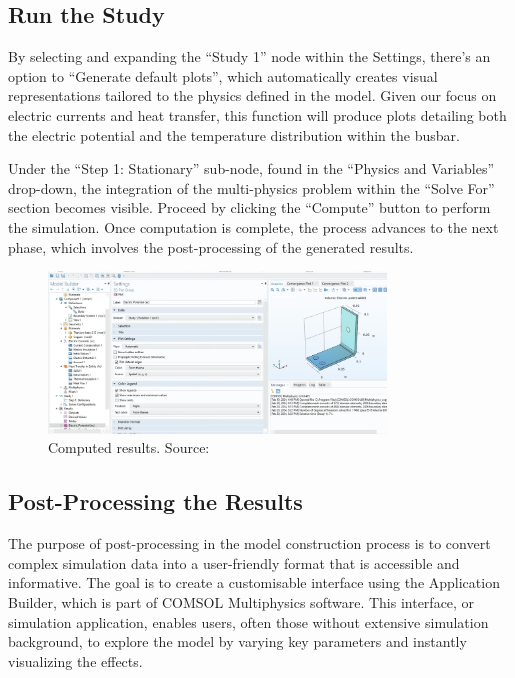 \subsection{Run the Study}
By selecting and expanding the ``Study 1'' node within the Settings, there's an option to ``Generate default plots'', which automatically creates visual representations tailored to the physics defined in the model. Given our focus on electric currents and heat transfer, this function will produce plots detailing both the electric potential and the temperature distribution within the busbar.

Under the ``Step 1: Stationary'' sub-node, found in the ``Physics and Variables'' drop-down, the integration of the multi-physics problem within the ``Solve For'' section becomes visible. Proceed by clicking the ``Compute'' button to perform the simulation. Once computation is complete, the process advances to the next phase, which involves the post-processing of the generated results.

\begin{figure}[H]
  \centering
  \includegraphics[width=0.8\textwidth]{Chapters/Figures/Chapter 3 Figures/Computed Results.png}
  \caption{Computed results. Source: \cite{multiphysics__modeling_nodate}}
  \label{fig:computed results}
\end{figure}

\subsection{Post-Processing the Results}
The purpose of post-processing in the model construction process is to convert complex simulation data into a user-friendly format that is accessible and informative. The goal is to create a customisable interface using the Application Builder, which is part of COMSOL Multiphysics software. This interface, or simulation application, enables users, often those without extensive simulation background, to explore the model by varying key parameters and instantly visualizing the effects.

